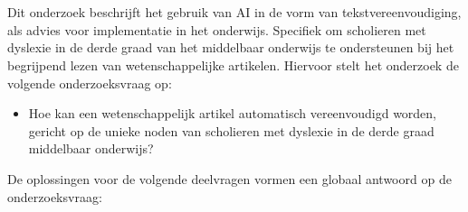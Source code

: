 \section{}%
\label{sec:onderzoeksvraag}

Dit onderzoek beschrijft het gebruik van AI in de vorm van tekstvereenvoudiging, als advies voor implementatie in het onderwijs. Specifiek om scholieren met dyslexie in de derde graad van het middelbaar onderwijs te ondersteunen bij het begrijpend lezen van wetenschappelijke artikelen. Hiervoor stelt het onderzoek de volgende onderzoeksvraag op: 

\begin{itemize}
	\item Hoe kan een wetenschappelijk artikel automatisch vereenvoudigd worden, gericht op de unieke noden van scholieren met dyslexie in de derde graad middelbaar onderwijs?
\end{itemize}

De oplossingen voor de volgende deelvragen vormen een globaal antwoord op de onderzoeksvraag:

